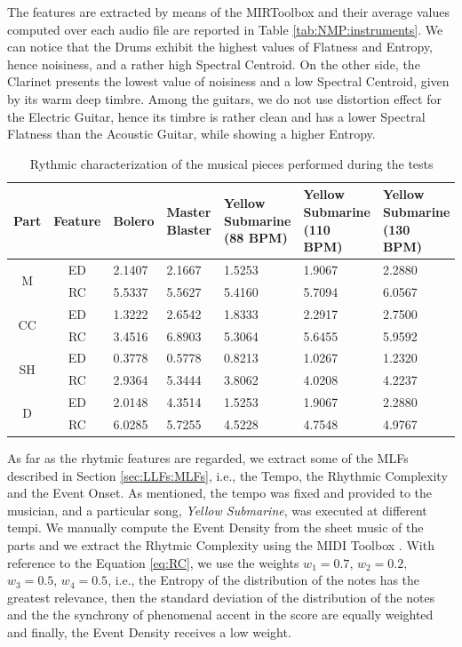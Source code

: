 The features are extracted by means of the MIRToolbox \cite{Lartillot2007} and their average values computed over each audio file are reported in Table \ref{tab:NMP:instruments}. We can notice that the Drums exhibit the highest values of Flatness and Entropy, hence noisiness, and a rather high Spectral Centroid. On the other side, the Clarinet presents the lowest value of noisiness and a low Spectral Centroid, given by its warm deep timbre. Among the guitars, we do not use distortion effect for the Electric Guitar, hence its timbre is rather clean and has a lower Spectral Flatness than the Acoustic Guitar, while showing a higher Entropy.

\begin{table}[tb]
  \caption{Rythmic characterization of the musical pieces performed during the tests}
  \centering %
  \label{tab:NMP:pieces}  
  \bgroup
  \def\arraystretch{1.5}
 \begin{tabular}{||c|c|p{1.4cm}|p{1.4cm}|p{1.8cm}|p{1.8cm}|p{1.8cm}||}
 \hline
 \hline
Part &	Feature & Bolero & Master Blaster & Yellow Submarine (88 BPM) & Yellow Submarine (110 BPM) & Yellow Submarine (130 BPM)\\
 \hline
 \hline
 \multirow{2}{*}{M}& ED & 2.1407 & 2.1667 & 1.5253 & 1.9067 & 2.2880 \\
 				   & RC & 5.5337 & 5.5627 & 5.4160 & 5.7094 & 6.0567 \\
\hline
\multirow{2}{*}{CC}& ED & 1.3222 & 2.6542 & 1.8333 & 2.2917 & 2.7500 \\
				  & RC & 3.4516 & 6.8903 & 5.3064 & 5.6455 & 5.9592\\
\hline
\multirow{2}{*}{SH}& ED & 0.3778 & 0.5778 & 0.8213 & 1.0267 & 1.2320 \\
 				  & RC & 2.9364 & 5.3444 & 3.8062 & 4.0208 & 4.2237\\
\hline
\multirow{2}{*}{D}& ED & 2.0148 & 4.3514 & 1.5253 & 1.9067 & 2.2880 \\
			   & RC & 6.0285 & 5.7255 & 4.5228 & 4.7548 &  4.9767 \\
 \hline
 \hline
   \end{tabular}
   \egroup
\end{table}

As far as the rhytmic features are regarded, we extract some of the MLFs described in Section \ref{sec:LLFs:MLFs}, i.e., the Tempo, the Rhythmic Complexity and the Event Onset. As mentioned, the tempo was fixed and provided to the musician, and a particular song, \textit{Yellow Submarine}, was executed at different tempi. We manually compute the Event Density \cite{Lartillot2007} from the sheet music of the parts and we extract the Rhytmic Complexity \cite{povel} using the MIDI Toolbox \cite{Eerola2004}. With reference to the Equation \ref{eq:RC}, we use the weights $w_1= 0.7$, $w_2=0.2,$  $w_3=0.5$, $w_4=0.5$, i.e., the Entropy of the distribution of the notes has the greatest relevance, then the standard deviation of the distribution of the notes and the the synchrony of phenomenal accent in the score are equally weighted and finally, the Event Density receives a low weight. 

